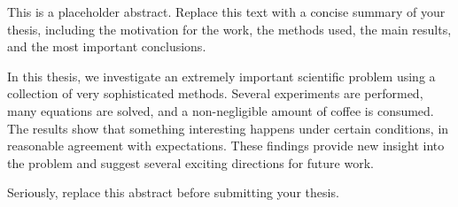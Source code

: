 This is a placeholder abstract. Replace this text with a concise summary of your thesis, including the motivation for the work, the methods used, the main results, and the most important conclusions.

In this thesis, we investigate an extremely important scientific problem using a collection of very sophisticated methods. Several experiments are performed, many equations are solved, and a non-negligible amount of coffee is consumed. The results show that something interesting happens under certain conditions, in reasonable agreement with expectations. These findings provide new insight into the problem and suggest several exciting directions for future work.

Seriously, replace this abstract before submitting your thesis.
